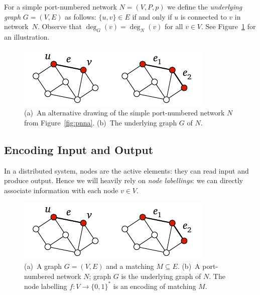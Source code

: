 For a simple port-numbered network $N = (V,P,p)$ we define the \emph{underlying graph} $G = (V,E)$ as follows: $\{u,v\} \in E$ if and only if $u$ is connected to $v$ in network~$N$. Observe that $\deg_G(v) = \deg_N(v)$ for all $v \in V$. See Figure~\ref{fig:pnnc} for an illustration.
\begin{figure}
    \centering
    \includegraphics[page=\PPnnC]{figs.pdf}
    \caption{(a)~An alternative drawing of the simple port-numbered network $N$ from Figure~\ref{fig:pnna}. (b)~The underlying graph $G$ of $N$.}\label{fig:pnnc}
\end{figure}

\subsection{Encoding Input and Output}\label{ssec:encoding-io}

In a distributed system, nodes are the active elements: they can read input and produce output. Hence we will heavily rely on \emph{node labellings}: we can directly associate information with each node $v \in V$.

\begin{figure}
    \centering
    \includegraphics[page=\PPnnD]{figs.pdf}
    \caption{(a)~A graph $G = (V,E)$ and a matching $M \subseteq E$. (b)~A port-numbered network $N$; graph $G$ is the underlying graph of $N$. The node labelling $f\colon V \to \{0,1\}^*$ is an encoding of matching $M$.}\label{fig:pnnd}
\end{figure}

